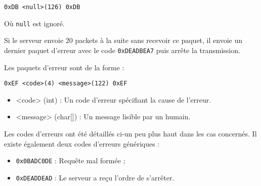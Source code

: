 \documentclass[a4paper,10pt,openany,oneside]{report}
\begin{document}
\begin{verbatim}
0xDB <null>(126) 0xDB
\end{verbatim}

Où \texttt{null} est ignoré.

Si le serveur envoie 20 packets à la suite sans recevoir ce paquet, il envoie
un dernier paquet d'erreur avec le code \texttt{0xDEADBEA7} puis arrête la
transmission.

Les paquets d'erreur sont de la forme :

\begin{verbatim}
0xEF <code>(4) <message>(122) 0xEF
\end{verbatim}

\begin{itemize}
    \item <code> (int) : Un code d'erreur spécifiant la cause de l'erreur.
    \item <message> (char[]) : Un message lisible par un humain.
\end{itemize}

Les codes d'erreurs ont été détaillés ci-un peu plus haut dans les cas
concernés. Il existe également deux codes d'erreurs génériques :

\begin{itemize}
    \item \texttt{0x0BADC0DE} : Requête mal formée ;
    \item \texttt{0xDEADDEAD} : Le serveur a reçu l'ordre de s'arrêter.
\end{itemize}
\end{document}
